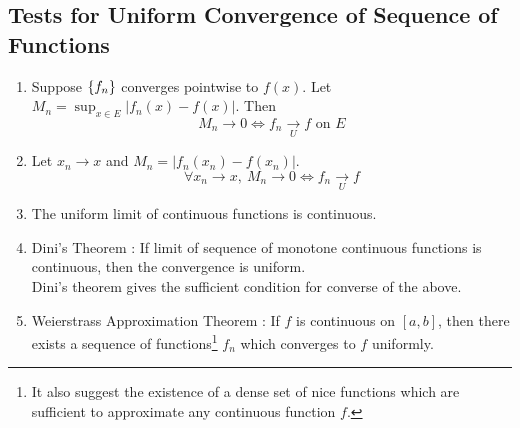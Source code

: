 \subsection{Tests for Uniform Convergence of Sequence of Functions}
\begin{enumerate}
	\item Suppose $\{f_n\}$ converges pointwise to $f(x)$. Let $M_n = \sup_{x \in E} |f_n(x) - f(x)|$. Then 
		$$M_n \to 0 \iff f_n \underset{U}{\to} f \text{ on } E$$
	\item Let $x_n \to x$ and $M_n = |f_n(x_n) - f(x_n)|$.
	$$\forall x_n \to x,\ M_n \to 0 \iff f_n \underset{U}{\to} f$$
	\item The uniform limit of continuous functions is continuous.
	\item Dini's Theorem : If limit of sequence of monotone continuous functions is continuous, then the convergence is uniform.\\
	Dini's theorem gives the sufficient condition for converse of the above.
	\item Weierstrass Approximation Theorem : If $f$ is continuous on $[a,b]$, then there exists a sequence of functions\footnote{It also suggest the existence of a dense set of nice functions which are sufficient to approximate any continuous function $f$.} $f_n$ which converges to $f$ uniformly.
\end{enumerate}

